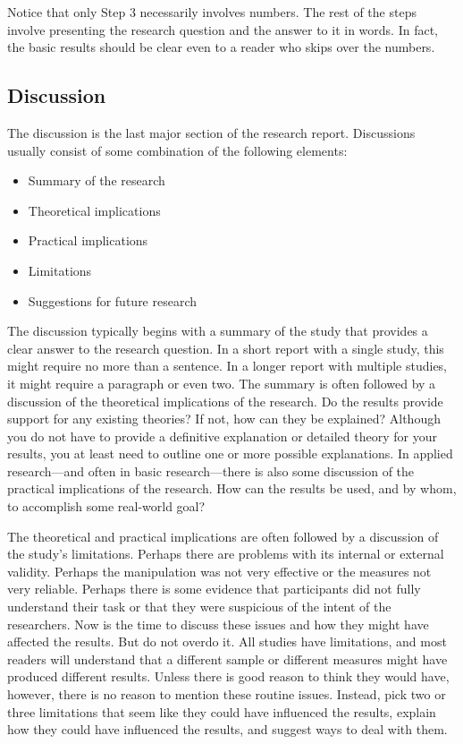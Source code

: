Notice that only Step 3 necessarily involves numbers. The rest of the steps involve presenting the research question and the answer to it in words. In fact, the basic results should be clear even to a reader who skips over the numbers.



\subsection{Discussion}

The discussion is the last major section of the research report. Discussions usually consist of some combination of the following elements:


\begin{itemize}
\item Summary of the research

\item Theoretical implications

\item Practical implications

\item Limitations

\item Suggestions for future research

\end{itemize}

The discussion typically begins with a summary of the study that provides a clear answer to the research question. In a short report with a single study, this might require no more than a sentence. In a longer report with multiple studies, it might require a paragraph or even two. The summary is often followed by a discussion of the theoretical implications of the research. Do the results provide support for any existing theories? If not, how can they be explained? Although you do not have to provide a definitive explanation or detailed theory for your results, you at least need to outline one or more possible explanations. In applied research---and often in basic research---there is also some discussion of the practical implications of the research. How can the results be used, and by whom, to accomplish some real-world goal?


The theoretical and practical implications are often followed by a discussion of the study's limitations. Perhaps there are problems with its internal or external validity. Perhaps the manipulation was not very effective or the measures not very reliable. Perhaps there is some evidence that participants did not fully understand their task or that they were suspicious of the intent of the researchers. Now is the time to discuss these issues and how they might have affected the results. But do not overdo it. All studies have limitations, and most readers will understand that a different sample or different measures might have produced different results. Unless there is good reason to think they would have, however, there is no reason to mention these routine issues. Instead, pick two or three limitations that seem like they could have influenced the results, explain how they could have influenced the results, and suggest ways to deal with them.


